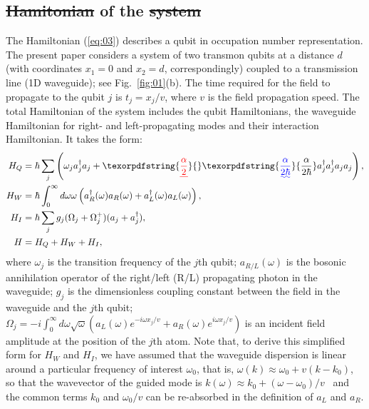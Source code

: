 \documentclass[lettersize,journal]{IEEEtran}
\providecommand{\DIFaddtex}[1]{{\protect\color{blue}\uwave{#1}}} %
\providecommand{\DIFdeltex}[1]{{\protect\color{red}\sout{#1}}}                      %
\providecommand{\DIFaddbegin}{} %
\providecommand{\DIFaddend}{} %
\providecommand{\DIFdelbegin}{} %
\providecommand{\DIFdelend}{} %
\providecommand{\DIFadd}[1]{\texorpdfstring{\DIFaddtex{#1}}{#1}} %
\providecommand{\DIFdel}[1]{\texorpdfstring{\DIFdeltex{#1}}{}} %
\newcommand{\DIFscaledelfig}{0.5}
\newlength{\DIFdelgraphicswidth} %
\newlength{\DIFdelgraphicsheight} %
\newcommand{\DIFaddincludegraphics}[2][]{{\color{blue}\fbox{\DIFOincludegraphics[#1]{#2}}}} %
\newcommand{\DIFdelincludegraphics}[2][]{%
\sbox{\DIFdelgraphicsbox}{\DIFOincludegraphics[#1]{#2}}%
\settoboxwidth{\DIFdelgraphicswidth}{\DIFdelgraphicsbox} %
\settoboxtotalheight{\DIFdelgraphicsheight}{\DIFdelgraphicsbox} %
\scalebox{\DIFscaledelfig}{%
\parbox[b]{\DIFdelgraphicswidth}{\usebox{\DIFdelgraphicsbox}\\[-\baselineskip] \rule{\DIFdelgraphicswidth}{0em}}\llap{\resizebox{\DIFdelgraphicswidth}{\DIFdelgraphicsheight}{%
\setlength{\unitlength}{\DIFdelgraphicswidth}%
\begin{picture}(1,1)%
\thicklines\linethickness{2pt} %
{\color[rgb]{1,0,0}\put(0,0){\framebox(1,1){}}}%
{\color[rgb]{1,0,0}\put(0,0){\line( 1,1){1}}}%
{\color[rgb]{1,0,0}\put(0,1){\line(1,-1){1}}}%
\end{picture}%
}\hspace*{3pt}}} %
} %
\DeclareRobustCommand{\DIFaddbegin}{\DIFOaddbegin \let\includegraphics\DIFaddincludegraphics} %
\DeclareRobustCommand{\DIFaddend}{\DIFOaddend \let\includegraphics\DIFOincludegraphics} %
\DeclareRobustCommand{\DIFdelbegin}{\DIFOdelbegin \let\includegraphics\DIFdelincludegraphics} %
\DeclareRobustCommand{\DIFdelend}{\DIFOaddend \let\includegraphics\DIFOincludegraphics} %
\begin{document}
\subsection{\DIFdelbegin \DIFdel{Hamitonian }\DIFdelend \DIFaddbegin \DIFadd{Hamiltonian }\DIFaddend of the \DIFdelbegin \DIFdel{system}\DIFdelend \DIFaddbegin \DIFadd{System}\DIFaddend }

The Hamiltonian (\ref{eq:03}) describes a qubit in occupation number representation.
The present paper considers a system of two transmon qubits at a distance $d$ (with coordinates $x_1 = 0$ and $x_2 = d$, correspondingly)  coupled to a transmission line (1D waveguide); see Fig.~\ref{fig:01}(b).
The time required for the field to propagate to the qubit $j$ is $t_j = x_j / v$, where $v$ is the field propagation speed.
The total Hamiltonian of the system includes the qubit Hamiltonians, the waveguide Hamiltonian for right- and left-propagating modes and their interaction Hamiltonian.
It takes the form:
\begin{align} \label{eq:04}
    H_Q &= \hbar \sum_j \left( \omega_j a_j^\dag a_j + \DIFdelbegin \DIFdel{\frac{\alpha}{2} }\DIFdelend \DIFaddbegin \DIFadd{\frac{\alpha}{2 \hbar} }\DIFaddend a_j^\dag a_j^\dag a_j a_j \right), \\
    H_W &= \hbar \int_0^\infty d \omega \omega \left( a_R^\dag(\omega) a_R(\omega) + a_L^\dag(\omega) a_L(\omega) \right), \\
    H_I &= \hbar \sum_j g_j (\Omega_j + \Omega_j^+) (a_j + a_j^\dag), \\
    H &= H_Q + H_W + H_I,
\end{align}
where $\omega_j$ is the transition frequency of the $j$th qubit; $a_{R/L}(\omega)$ is the bosonic annihilation operator of the right/left (R/L) propagating photon in the waveguide; $g_j$ is the dimensionless coupling constant between the field in the waveguide and the $j$th qubit; $\Omega_j = - i \int_0^\infty d \omega \sqrt{\omega} \left( a_L(\omega) e^{-i \omega x_j / v} + a_R(\omega) e^{i \omega x_j / v} \right)$ is an incident field amplitude at the position of the $j$th atom.
Note that, to derive this simplified form for $H_W$ and $H_I$, we have assumed that the waveguide dispersion is linear around a particular frequency of interest $\omega_0$, that is, $\omega(k) \approx \omega_0 + v (k - k_0)$, so that the wavevector of the guided mode is $k(\omega) \approx k_0 + (\omega - \omega_0) / v$~\cite{shen_theory_2009} and the common terms $k_0$ and $\omega_0/v$ can be re-absorbed in the definition of $a_L$ and $a_R$.
\end{document}

